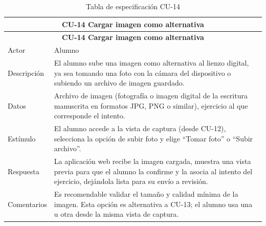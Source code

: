 \begin{longtable}{|p{4cm}|p{11cm}|}
\caption{Tabla de especificación CU-14}
\label{tab:cu14} \\

\hline
\multicolumn{2}{|c|}{\textbf{CU-14 Cargar imagen como alternativa}} \\
\hline
\endfirsthead

\hline
\multicolumn{2}{|c|}{\textbf{CU-14 Cargar imagen como alternativa}} \\
\hline
\endhead

\hline
\endfoot
\endlastfoot

Actor & Alumno \\
\hline

Descripción & El alumno sube una imagen como alternativa al lienzo digital, ya sea tomando una foto con la cámara del dispositivo o subiendo un archivo de imagen guardado. \\
\hline

Datos & Archivo de imagen (fotografía o imagen digital de la escritura manuscrita en formatos JPG, PNG o similar), ejercicio al que corresponde el intento. \\
\hline

Estímulo & El alumno accede a la vista de captura (desde CU-12), selecciona la opción de subir foto y elige “Tomar foto” o “Subir archivo”. \\
\hline

Respuesta & La aplicación web recibe la imagen cargada, muestra una vista previa para que el alumno la confirme y la asocia al intento del ejercicio, dejándola lista para su envío a revisión. \\
\hline

Comentarios & Es recomendable validar el tamaño y calidad mínima de la imagen. Esta opción es alternativa a CU-13; el alumno usa una u otra desde la misma vista de captura. \\
\hline

\end{longtable}


